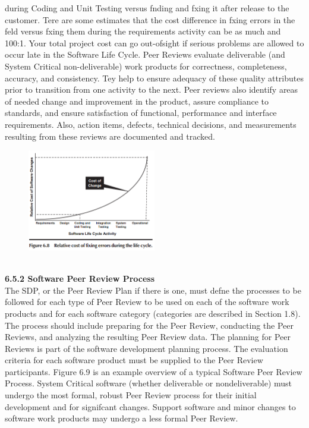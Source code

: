 \documentclass[twocolumn,a4paper,13pt]{book}
\begin{document}
during Coding and Unit Testing versus fnding and fxing
it after release to the customer. Tere are some estimates
that the cost diﬀerence in fxing errors in the feld versus fxing them during the requirements activity can be
as much and 100:1. Your total project cost can go out-ofsight if serious problems are allowed to occur late in the
Software Life Cycle.
Peer Reviews evaluate deliverable (and System Critical
non-deliverable) work products for correctness, completeness, accuracy, and consistency. Tey help to ensure adequacy of these quality attributes prior to transition from
one activity to the next. Peer reviews also identify areas of
needed change and improvement in the product, assure compliance to standards, and ensure satisfaction of functional,
performance and interface requirements. Also, action items,
defects, technical decisions, and measurements resulting
from these reviews are documented and tracked.
\begin{figure}[h!]
	\centering
	\includegraphics[width=0.5\textwidth]{p2}
\end{figure}\\
\textbf{6.5.2 Software Peer Review Process}\\
The SDP, or the Peer Review Plan if there is one, must defne
the processes to be followed for each type of Peer Review to
be used on each of the software work products and for each
software category (categories are described in Section 1.8).
The process should include preparing for the Peer Review,
conducting the Peer Reviews, and analyzing the resulting
Peer Review data. The planning for Peer Reviews is part of
the software development planning process. The evaluation
criteria for each software product must be supplied to the
Peer Review participants. Figure 6.9 is an example overview
of a typical Software Peer Review Process.
System Critical software (whether deliverable or nondeliverable) must undergo the most formal, robust Peer
Review process for their initial development and for signifcant changes. Support software and minor changes to software work products may undergo a less formal Peer Review.\\
\end{document}
